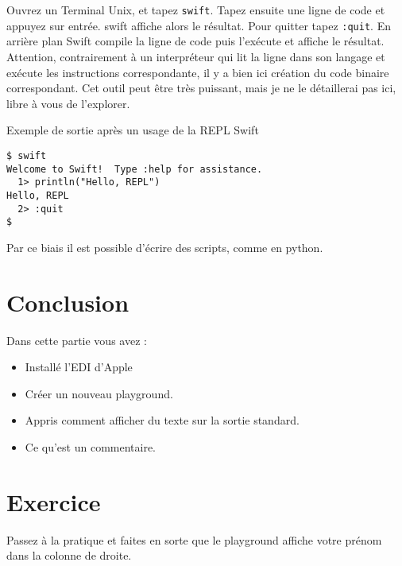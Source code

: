 Ouvrez un Terminal Unix, et tapez \verb"swift".
Tapez ensuite une ligne de code et appuyez sur entrée.
swift affiche alors le résultat.
Pour quitter tapez \verb":quit".
En arrière plan Swift compile la ligne de code
puis l'exécute et affiche le résultat.
Attention, contrairement à un interpréteur qui lit la ligne dans son langage
et exécute les instructions correspondante,
il y a bien ici création du code binaire correspondant.
Cet outil peut être très puissant,
mais je ne le détaillerai pas ici, libre à vous de l’explorer.
\begin{listing}[H]
\caption{Exemple de sortie après un usage de la REPL Swift}
\begin{verbatim}
$ swift
Welcome to Swift!  Type :help for assistance.
  1> println("Hello, REPL")
Hello, REPL
  2> :quit
$
\end{verbatim}
\end{listing}
Par ce biais il est possible d'écrire des scripts, comme en python.



\section*{Conclusion}
{}
Dans cette partie vous avez :
\begin{itemize}
\item Installé l'EDI d'Apple
\item Créer un nouveau playground.
\item Appris comment afficher du texte sur la sortie standard.
\item Ce qu'est un commentaire.
\end{itemize}
\section*{Exercice}
{}
Passez à la pratique et faites en sorte que le playground affiche
votre prénom dans la colonne de droite.
